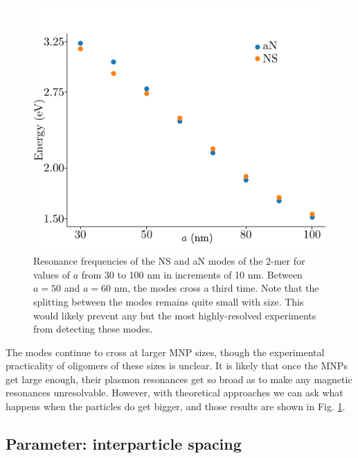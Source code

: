 \documentclass [11pt, proquest] {uwthesis}[2016/11/22]
\begin{document}
\begin{figure}
\begin{centering}
\includegraphics{bigger_particles.pdf}
\caption{Resonance frequencies of the NS and aN modes of the 2-mer for values of $a$ from 30 to 100 nm in increments of 10 nm. Between $a=50$ and $a=60$ nm, the modes cross a third time. Note that the splitting between the modes remains quite small with size. This would likely prevent any but the most highly-resolved experiments from detecting these modes.}
\label{bigp}
\end{centering}
\end{figure}


The modes continue to cross at larger MNP sizes, though the experimental practicality of oligomers of these sizes is unclear. It is likely that once the MNPs get large enough, their plasmon resonances get so broad as to make any magnetic resonances unresolvable. However, with theoretical approaches we can ask what happens when the particles do get bigger, and those results are shown in Fig. \ref{bigp}. 

\subsection{Parameter: interparticle spacing}
\end{document}
